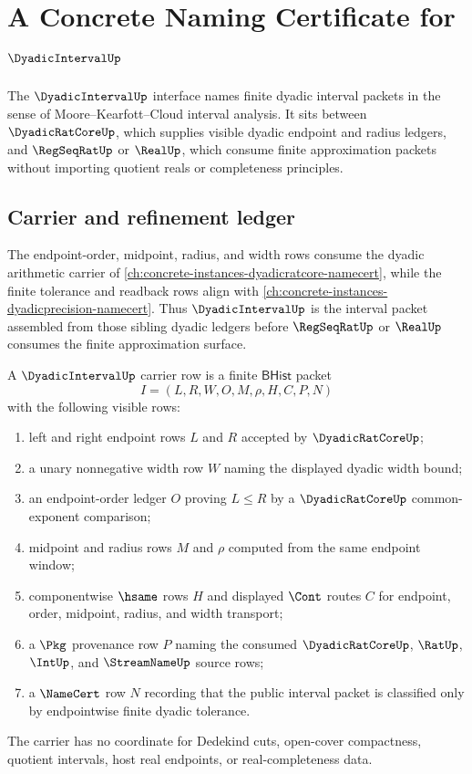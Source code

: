 \chapter{A Concrete Naming Certificate for $\DyadicIntervalUp$}
\label{ch:concrete-instances-dyadicinterval-namecert}

The $\DyadicIntervalUp$ interface names finite dyadic interval packets in the
sense of Moore--Kearfott--Cloud interval analysis. It sits between
$\DyadicRatCoreUp$, which supplies visible dyadic endpoint and radius ledgers,
and $\RegSeqRatUp$ or $\RealUp$, which consume finite approximation packets
without importing quotient reals or completeness principles.

\section{Carrier and refinement ledger}
\label{sec:dyadicinterval-carrier-refinement}

The endpoint-order, midpoint, radius, and width rows consume the dyadic
arithmetic carrier of
\autoref{ch:concrete-instances-dyadicratcore-namecert}, while the finite
tolerance and readback rows align with
\autoref{ch:concrete-instances-dyadicprecision-namecert}. Thus
$\DyadicIntervalUp$ is the interval packet assembled from those sibling
dyadic ledgers before $\RegSeqRatUp$ or $\RealUp$ consumes the finite
approximation surface.

\begin{definition}
\label{def:dyadicinterval-carrier}
A $\DyadicIntervalUp$ carrier row is a finite $\mathsf{BHist}$ packet
$$
I=(L,R,W,O,M,\rho,H,C,P,N)
$$
with the following visible rows:
\begin{enumerate}
\item left and right endpoint rows $L$ and $R$ accepted by
$\DyadicRatCoreUp$;
\item a unary nonnegative width row $W$ naming the displayed dyadic
width bound;
\item an endpoint-order ledger $O$ proving $L\leq R$ by a
$\DyadicRatCoreUp$ common-exponent comparison;
\item midpoint and radius rows $M$ and $\rho$ computed from the same
endpoint window;
\item componentwise $\hsame$ rows $H$ and displayed $\Cont$ routes $C$ for
endpoint, order, midpoint, radius, and width transport;
\item a $\Pkg$ provenance row $P$ naming the consumed
$\DyadicRatCoreUp$, $\RatUp$, $\IntUp$, and $\StreamNameUp$ source rows;
\item a $\NameCert$ row $N$ recording that the public interval packet is
classified only by endpointwise finite dyadic tolerance.
\end{enumerate}
The carrier has no coordinate for Dedekind cuts, open-cover compactness,
quotient intervals, host real endpoints, or real-completeness data.
\end{definition}

